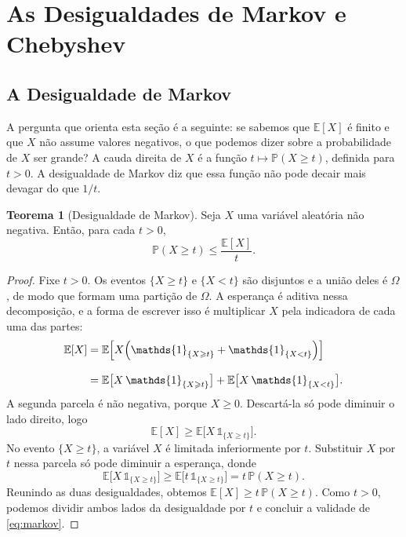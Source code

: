 \documentclass[12pt,portuguese]{article}
\theoremstyle{definition}
\newtheorem{theorem}{Teorema}
\theoremstyle{plainexercise}
\theoremstyle{starredexercise}
\theoremstyle{definition}
\begin{document}
\section{As Desigualdades de Markov e Chebyshev}\label{sec:markov-chebyshev}

\subsection{A Desigualdade de Markov}\label{subsec:markov}

A pergunta que orienta esta seção é a seguinte: se sabemos que
$\mathbb{E}[X]$ é finito e que $X$ não assume valores negativos, o que podemos
dizer sobre a probabilidade de $X$ ser grande? A cauda direita de $X$ é a
função $t\longmapsto\mathbb{P}(X\geqslant t)$, definida para $t>0$. A
desigualdade de Markov diz que essa função não pode decair mais devagar do que
$1/t$.

\begin{theorem}[Desigualdade de Markov]\label{thm:markov}
Seja $X$ uma variável aleatória não negativa. Então, para cada $t>0$,
\begin{equation}\label{eq:markov}
\mathbb{P}(X\geqslant t)\leqslant\frac{\mathbb{E}[X]}{t}.
\end{equation}
\end{theorem}

\begin{proof}
Fixe $t>0$. Os eventos $\{X\geqslant t\}$ e $\{X<t\}$ são disjuntos e a união
deles é $\Omega$, de modo que formam uma partição de $\Omega$. A esperança é
aditiva nessa decomposição, e a forma de escrever isso é multiplicar $X$ pela
indicadora de cada uma das partes:
\begin{align*}
\mathbb{E}[X]
&=
\mathbb{E}\Bigl[X\Bigl(\mathds{1}_{\{X\geqslant t\}}
+\mathds{1}_{\{X<t\}}\Bigr)\Bigr]
\\[0.3cm]
&=
\mathbb{E}\bigl[X\,\mathds{1}_{\{X\geqslant t\}}\bigr]
+
\mathbb{E}\bigl[X\,\mathds{1}_{\{X<t\}}\bigr].
\end{align*}
A segunda parcela é não negativa, porque $X\geqslant0$. Descartá-la só pode
diminuir o lado direito, logo
\[
\mathbb{E}[X]\geqslant\mathbb{E}\bigl[X\,\mathds{1}_{\{X\geqslant t\}}\bigr].
\]
No evento $\{X\geqslant t\}$, a variável $X$ é limitada inferiormente por $t$.
Substituir $X$ por $t$ nessa parcela só pode diminuir a esperança, donde
\[
\mathbb{E}\bigl[X\,\mathds{1}_{\{X\geqslant t\}}\bigr]
\geqslant
\mathbb{E}\bigl[t\,\mathds{1}_{\{X\geqslant t\}}\bigr]
=
t\,\mathbb{P}(X\geqslant t).
\]
Reunindo as duas desigualdades, obtemos
$\mathbb{E}[X]\geqslant t\,\mathbb{P}(X\geqslant t)$. Como $t>0$, podemos
dividir ambos lados da desigualdade por $t$ e concluir a validade de \eqref{eq:markov}.
\end{proof}
\end{document}
